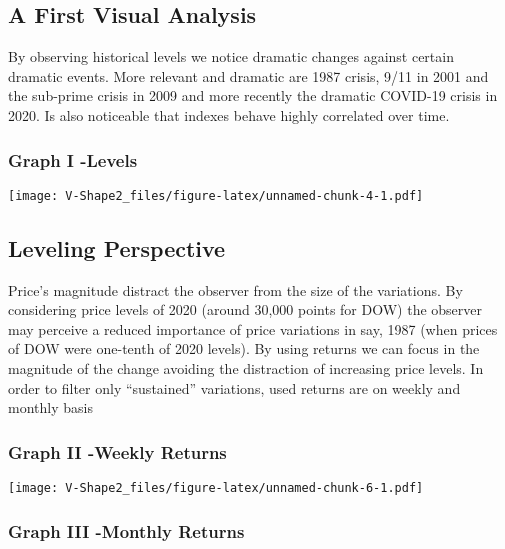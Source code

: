 \documentclass[
]{article}
\begin{document}
\hypertarget{a-first-visual-analysis}{%
\subsection{A First Visual Analysis}\label{a-first-visual-analysis}}

By observing historical levels we notice dramatic changes against
certain dramatic events. More relevant and dramatic are 1987 crisis,
9/11 in 2001 and the sub-prime crisis in 2009 and more recently the
dramatic COVID-19 crisis in 2020. Is also noticeable that indexes behave
highly correlated over time.

\hypertarget{graph-i--levels}{%
\subsubsection{Graph I -Levels}\label{graph-i--levels}}

\texttt{[image: V-Shape2\_files/figure-latex/unnamed-chunk-4-1.pdf]}

\hypertarget{leveling-perspective}{%
\subsection{Leveling Perspective}\label{leveling-perspective}}

Price's magnitude distract the observer from the size of the variations.
By considering price levels of 2020 (around 30,000 points for DOW) the
observer may perceive a reduced importance of price variations in say,
1987 (when prices of DOW were one-tenth of 2020 levels). By using
returns we can focus in the magnitude of the change avoiding the
distraction of increasing price levels. In order to filter only
``sustained'' variations, used returns are on weekly and monthly basis

\hypertarget{graph-ii--weekly-returns}{%
\subsubsection{Graph II -Weekly
Returns}\label{graph-ii--weekly-returns}}

\texttt{[image: V-Shape2\_files/figure-latex/unnamed-chunk-6-1.pdf]}

\hypertarget{graph-iii--monthly-returns}{%
\subsubsection{Graph III -Monthly
Returns}\label{graph-iii--monthly-returns}}
\end{document}
